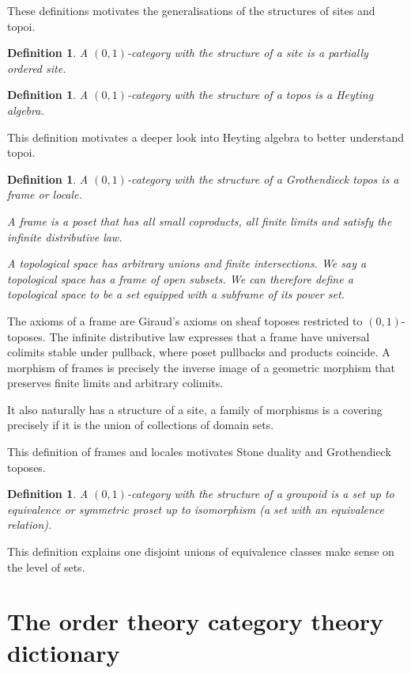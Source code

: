 \documentclass{tufte-book}
\newtheorem{definition}[theorem]{Definition}
\begin{document}
 These definitions motivates the generalisations of the structures of sites and topoi.
 
 \begin{definition}
 	A $(0,1)$-category with the structure of a site is a partially ordered site. 
 \end{definition}
 
 \begin{definition}
 	A $(0,1)$-category with the structure of a topos is a Heyting algebra. 
 \end{definition}
 
 This definition motivates a deeper look into Heyting algebra to better understand topoi.
 
 \begin{definition}
 	A $(0,1)$-category with the structure of a Grothendieck topos is a frame or locale.
 	
 	A frame is a poset that has all small coproducts, all finite limits and satisfy the infinite distributive law.
 
 	A topological space has arbitrary unions and finite intersections. We say a topological space has a frame of open subsets. We can therefore define a topological space to be a set equipped with a subframe of its power set.
 \end{definition}
 
 The axioms of a frame are Giraud's axioms on sheaf toposes restricted to $(0,1)$-toposes. The infinite distributive law expresses that a frame have universal colimits stable under pullback, where poset pullbacks and products coincide. A morphism of frames is precisely the inverse image of a geometric morphism that preserves finite limits and arbitrary colimits.
 
 It also naturally has a structure of a site, a family of morphisms is a covering precisely if it is the union of collections of domain sets.
 
 This definition of frames and locales motivates Stone duality and Grothendieck toposes.
 
 \begin{definition}
 	A $(0,1)$-category with the structure of a groupoid is a set up to equivalence or symmetric proset up to isomorphism (a set with an equivalence relation).
 \end{definition}
 
 This definition explains one disjoint unions of equivalence classes make sense on the level of sets.
 
 \section{The order theory category theory dictionary}
 
\end{document}
